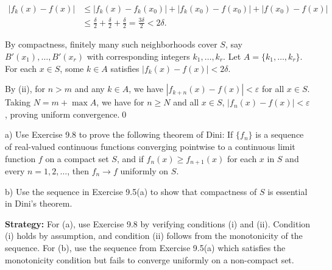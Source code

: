 \begin{align*}
|f_k(x) - f(x)| &\leq |f_k(x) - f_k(x_0)| + |f_k(x_0) - f(x_0)| + |f(x_0) - f(x)| \\
&\le \frac{\delta}{2} + \frac{\delta}{2} + \frac{\delta}{2} = \frac{3\delta}{2} < 2\delta.
\end{align*}

By compactness, finitely many such neighborhoods cover \( S \), say \( B'(x_1), \ldots, B'(x_r) \) with corresponding integers \( k_1, \ldots, k_r \). Let \( A = \{k_1, \ldots, k_r\} \). For each \( x \in S \), some \( k \in A \) satisfies \( |f_k(x) - f(x)| < 2\delta \).

By (ii), for \( n > m \) and any \( k \in A \), we have \( |f_{k+n}(x) - f(x)| < \varepsilon \) for all \( x \in S \). Taking \( N = m + \max A \), we have for \( n \geq N \) and all \( x \in S \), \( |f_n(x) - f(x)| < \varepsilon \), proving uniform convergence.\qed


\begin{problembox}
\begin{problemstatement}
a) Use Exercise 9.8 to prove the following theorem of Dini: If \( \{f_n\} \) is a sequence of real-valued continuous functions converging pointwise to a continuous limit function \( f \) on a compact set \( S \), and if \( f_n(x) \geq f_{n+1}(x) \) for each \( x \) in \( S \) and every \( n = 1, 2, \ldots \), then \( f_n \to f \) uniformly on \( S \).

b) Use the sequence in Exercise 9.5(a) to show that compactness of \( S \) is essential in Dini's theorem.
\end{problemstatement}
\end{problembox}

\noindent\textbf{Strategy:} For (a), use Exercise 9.8 by verifying conditions (i) and (ii). Condition (i) holds by assumption, and condition (ii) follows from the monotonicity of the sequence. For (b), use the sequence from Exercise 9.5(a) which satisfies the monotonicity condition but fails to converge uniformly on a non-compact set.


